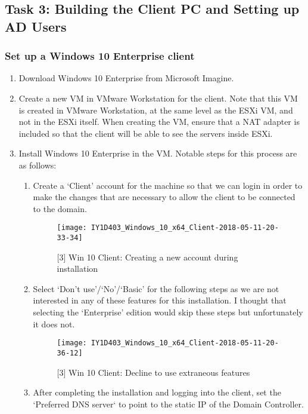 \pagebreak
\subsection{Task 3: Building the Client PC and Setting up AD Users}
\subsubsection{Set up a Windows 10 Enterprise client}
\begin{enumerate}[series=task3methodology1]
  \item Download Windows 10 Enterprise from Microsoft Imagine.
  \item Create a new VM in VMware Workstation for the client. Note that this VM is created in VMware Workstation, at the same level as the ESXi VM, and not in the ESXi itself. When creating the VM, ensure that a NAT adapter is included so that the client will be able to see the servers inside ESXi.
  \item Install Windows 10 Enterprise in the VM. Notable steps for this process are as follows:
    \begin{enumerate}[label=(\alph*)]
      \item Create a `Client' account for the machine so that we can login in order to make the changes that are necessary to allow the client to be connected to the domain.
        \begin{figure}[H]
          \centering
          \captionsetup{skip=2pt}
          \texttt{[image: IY1D403\_Windows\_10\_x64\_Client-2018-05-11-20-33-34]}
          \caption{[3] Win 10 Client: Creating a new account during installation}
          \label{fig:task3:win10client_01}
        \end{figure}
      \item Select `Don't use'/`No'/`Basic' for the following steps as we are not interested in any of these features for this installation. I thought that selecting the `Enterprise' edition would skip these steps but unfortunately it does not.
        \begin{figure}[H]
          \centering
          \captionsetup{skip=2pt}
          \texttt{[image: IY1D403\_Windows\_10\_x64\_Client-2018-05-11-20-36-12]}
          \caption{[3] Win 10 Client: Decline to use extraneous features}
          \label{fig:task3:win10client_02}
        \end{figure}
      \item After completing the installation and logging into the client, set the `Preferred DNS server` to point to the static IP of the Domain Controller.

\end{enumerate}
\end{enumerate}
